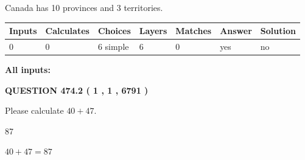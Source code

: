 \documentclass[12pt]{article}
\begin{document}
 
Canada has 10  provinces and 3 territories.
 
 
\noindent{}
 
 
   
   
   
   
\noindent\begin{tabular}{|l|l|l|l|l|l|l|}
 \hline
Inputs & Calculates & Choices & Layers & Matches & Answer & Solution \\ \hline
 0  & 
 0  & 
 6
  simple  
  & 
 6  & 
 0  & 
  yes & 
  no 
  \\ \hline
 \end{tabular}
   
   
   
   
\noindent{}
   
   
   
   
\noindent\vspace{0.1in}\hspace{-0.08in} {\textbf{\Large{All inputs: }}}
   
   
  
\vspace{0.2in}
  
{\textbf{\Large{QUESTION
474.2 
 ( 1 , 1 , 6791 )
}}}
  
  
 
Please calculate $ %
40 +  %
47 $.
 
 
 
\noindent{}
 
 

87
 
 
\noindent{}
 
 

 
 
 
\noindent{}
 
 

$ %
40 +  %
47=   %
87$
 
 
\noindent{}
 
 

 
   
\end{document}
